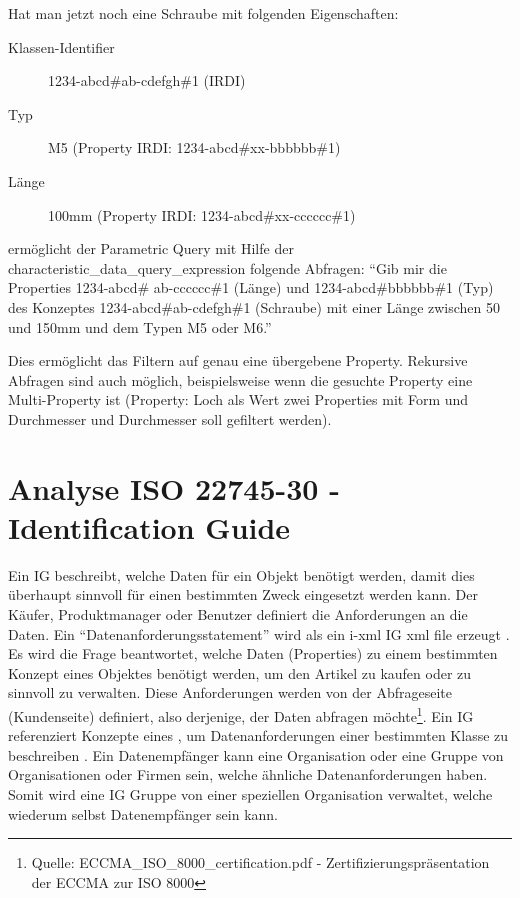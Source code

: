 Hat man jetzt noch eine Schraube mit folgenden Eigenschaften:
\begin{description}
\item[Klassen-Identifier] 1234-abcd\#ab-cdefgh\#1 (\gls{IRDI})
\item[Typ] M5 (Property IRDI: 1234-abcd\#xx-bbbbbb\#1)
\item[Länge] 100mm (Property \gls{IRDI}: 1234-abcd\#xx-cccccc\#1)
\end{description}

ermöglicht der Parametric Query mit Hilfe der characteristic\_data\_query\_expression folgende Abfragen:  \enquote{Gib mir die Properties 1234-abcd\# ab-cccccc\#1 (Länge) und 1234-abcd\#bbbbbb\#1 (Typ) des Konzeptes 1234-abcd\#ab-cdefgh\#1 (Schraube) mit einer Länge zwischen 50 und 150mm und dem Typen M5 oder M6.}

Dies ermöglicht das Filtern auf genau eine übergebene Property. Rekursive Abfragen sind auch möglich, beispielsweise wenn die gesuchte Property eine Multi-Property ist (Property: Loch als Wert zwei Properties mit Form und Durchmesser und Durchmesser soll gefiltert werden).

\section{Analyse ISO 22745-30 - Identification Guide}\label{kap:identification_guide_anhang}

Ein \gls{IG} beschreibt, welche Daten für ein Objekt benötigt werden, damit dies überhaupt sinnvoll für einen bestimmten Zweck eingesetzt werden kann. Der Käufer, Produktmanager oder Benutzer definiert die Anforderungen an die Daten. Ein  \enquote{Datenanforderungsstatement} wird als ein i-xml \gls{IG} xml file erzeugt \citep[vgl.][Slide 14 - Automating the Data Supply Chain]{bensonQuality}. Es wird die Frage beantwortet, welche Daten (Properties) zu einem bestimmten Konzept eines Objektes benötigt werden, um den Artikel zu kaufen oder zu sinnvoll zu verwalten. Diese Anforderungen werden von der Abfrageseite (Kundenseite) definiert, also derjenige, der Daten abfragen möchte\footnote{Quelle: ECCMA\_ISO\_8000\_certification.pdf - Zertifizierungspräsentation der ECCMA zur ISO 8000}.
Ein \gls{IG} referenziert Konzepte eines , um Datenanforderungen einer bestimmten Klasse zu beschreiben \citep[vgl.][Kapitel 5]{iso22745-30}.  
Ein Datenempfänger kann eine Organisation oder eine Gruppe von Organisationen oder Firmen sein, welche ähnliche Datenanforderungen haben. Somit wird eine \gls{IG} Gruppe von einer speziellen Organisation verwaltet, welche wiederum selbst Datenempfänger sein kann.  

